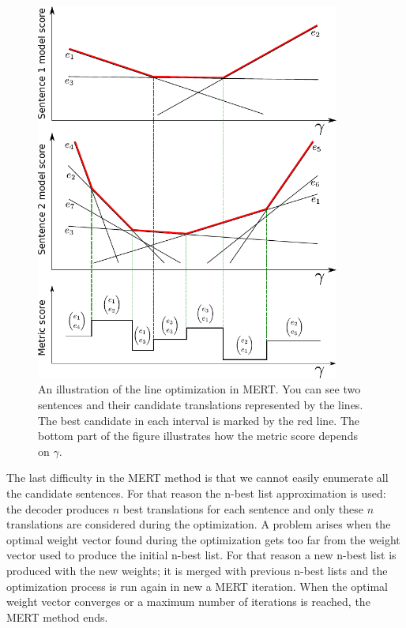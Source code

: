 \begin{figure}
    \begin{center}
        \includegraphics[width=10cm]{img/mert.pdf}
    \end{center}

    \caption[An illustration of the line optimization in MERT]{
      An illustration of the line optimization in MERT. You can see two sentences and their
      candidate translations represented by the lines. The best candidate in each interval
      is marked by the red line. The bottom part of the figure illustrates how the metric score
      depends on $\gamma$.
}

    \label{fig:lines}
\end{figure}

The last difficulty in the MERT method is that we cannot easily enumerate all
the candidate sentences. For that reason the n-best list approximation is used:
the decoder produces $n$ best translations for each sentence and only these $n$
translations are considered during the optimization. A problem arises when the
optimal weight vector found during the optimization gets too far from the
weight vector used to produce the initial n-best list. For that reason a new
n-best list is produced with the new weights; it is merged with previous n-best
lists and the optimization process is run again in new a MERT iteration. When the
optimal weight vector converges or a maximum number of iterations is reached,
the MERT method ends. 

